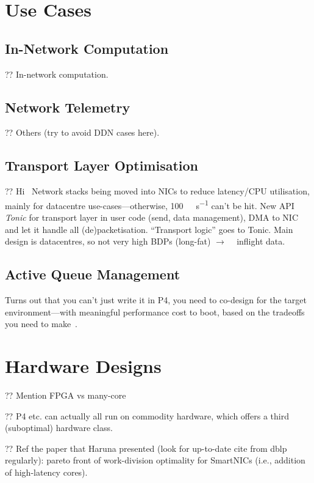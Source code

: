 \section{Use Cases}

\subsection{In-Network Computation}
?? In-network computation.

\subsection{Network Telemetry}
?? Others (try to avoid DDN cases here).

\subsection{Transport Layer Optimisation}
?? Hi~\parencite{DBLP:conf/nsdi/ArashlooLGRWW20} Network stacks being moved into NICs to reduce latency/CPU utilisation, mainly for datacentre use-cases---otherwise, \SI{100}{\giga\bit\per\second} can't be hit. New API \emph{Tonic} for transport layer in user code (send, data management), DMA to NIC and let it handle all (de)packetisation. ``Transport logic'' goes to Tonic. Main design is datacentres, so not very high BDPs (long-fat) $\rightarrow$ \si{\kilo\byte} inflight data.

\subsection{Active Queue Management}
Turns out that you can't just write it in P4, you need to co-design for the target environment---with meaningful performance cost to boot, based on the tradeoffs you need to make~\parencite{Kunze-P4-AQM}.

\section{Hardware Designs}

?? Mention FPGA vs many-core

?? P4 etc. can actually all run on commodity hardware, which offers a third (suboptimal) hardware class.

?? Ref the paper that Haruna presented \parencite{haruna-rg-paper} (look for up-to-date cite from dblp regularly): pareto front of work-division optimality for SmartNICs (i.e., addition of high-latency cores).

